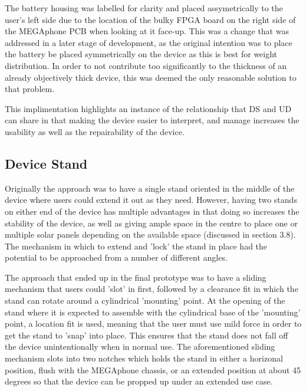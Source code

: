 The battery housing was labelled for clarity and placed assymetrically to the user's left side due to the location of the bulky FPGA board on the right side of the MEGAphone PCB when looking at it face-up.
This was a change that was addressed in a later stage of development, as the original intention was to place the battery be placed symmetrically on the device as this is best for weight distribution.
In order to not contribute too significantly to the thickness of an already objectively thick device, this was deemed the only reasonable solution to that problem.

This implimentation highlights an instance of the relationship that DS and UD can share in that making the device easier to interpret, and manage increases the usability as well as the repairability of the device.

\subsection{Device Stand}

Originally the approach was to have a single stand oriented in the middle of the device where users could extend it out as they need.
However, having two stands on either end of the device has multiple advantages in that doing so increases the stability of the device, as well as giving ample space in the centre to place one or multiple solar panels depending on the available space (discussed in section 3.8).
The mechanism in which to extend and 'lock' the stand in place had the potential to be approached from a number of different angles.

The approach that ended up in the final prototype was to have a sliding mechanism that users could 'slot' in first, followed by a clearance fit in which the stand can rotate around a cylindrical 'mounting' point.  %
At the opening of the stand where it is expected to assemble with the cylindrical base of the 'mounting' point, a location fit is used, meaning that the user must use mild force in order to get the stand to 'snap' into place.
This ensures that the stand does not fall off the device unintentionally when in normal use.
The aforementioned sliding mechanism slots into two notches which holds the stand in either a horizonal position, flush with the MEGAphone chassis, or an extended position at about 45 degrees so that the device can be propped up under an extended use case.

